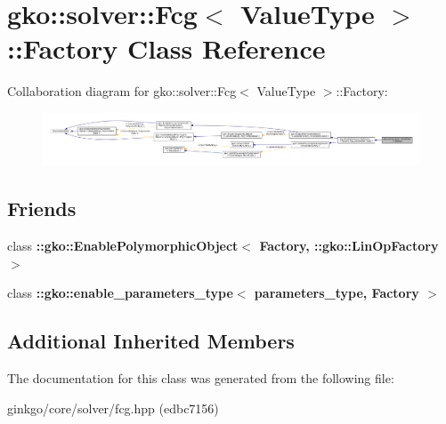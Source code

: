 \hypertarget{classgko_1_1solver_1_1Fcg_1_1Factory}{}\section{gko\+:\+:solver\+:\+:Fcg$<$ Value\+Type $>$\+:\+:Factory Class Reference}
\label{classgko_1_1solver_1_1Fcg_1_1Factory}


Collaboration diagram for gko\+:\+:solver\+:\+:Fcg$<$ Value\+Type $>$\+:\+:Factory\+:
\nopagebreak
\begin{figure}[H]
\begin{center}
\leavevmode
\includegraphics[width=350pt]{classgko_1_1solver_1_1Fcg_1_1Factory__coll__graph}
\end{center}
\end{figure}
\subsection*{Friends}
\begin{DoxyCompactItemize}
\item 
\mbox{\label{classgko_1_1solver_1_1Fcg_1_1Factory_a27e9bbc94a1c1c59f40833153eda8f78}} 
class {\bfseries \+::gko\+::\+Enable\+Polymorphic\+Object$<$ Factory, \+::gko\+::\+Lin\+Op\+Factory $>$}
\item 
\mbox{\label{classgko_1_1solver_1_1Fcg_1_1Factory_a0d176cbd42d6214e11aee8c30ca256fc}} 
class {\bfseries \+::gko\+::enable\+\_\+parameters\+\_\+type$<$ parameters\+\_\+type, Factory $>$}
\end{DoxyCompactItemize}
\subsection*{Additional Inherited Members}


The documentation for this class was generated from the following file\+:\begin{DoxyCompactItemize}
\item 
ginkgo/core/solver/fcg.\+hpp (edbc7156)\end{DoxyCompactItemize}
